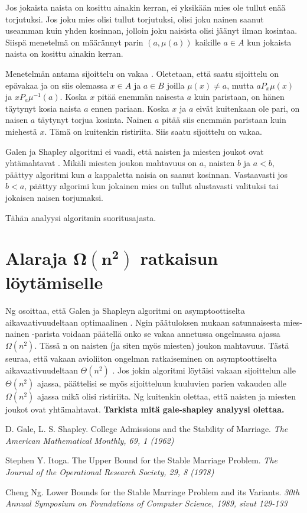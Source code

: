 \documentclass[gradu, twoside]{tktltiki}
\begin{document}
Jos jokaista naista on kosittu ainakin kerran, ei yksikään mies ole
tullut enää torjutuksi. Jos joku mies olisi tullut torjutuksi, olisi
joku nainen saanut useamman kuin yhden kosinnan, jolloin joku naisista
olisi jäänyt ilman kosintaa. Siispä menetelmä on määrännyt parin $(a,
\mu(a))$ kaikille $a \in A$ kun jokaista naista on kosittu ainakin
kerran.

Menetelmän antama sijoittelu on vakaa \cite{galeshapley62}. Oletetaan,
että saatu sijoittelu on epävakaa ja on siis olemassa $x \in A$ ja $a
\in B$ joilla $\mu(x) \neq a$, mutta $aP_x\mu(x)$ ja
$xP_a\mu^{-1}(a)$. Koska $x$ pitää enemmän naisesta $a$ kuin
paristaan, on hänen täytynyt kosia naista $a$ ennen pariaan. Koska $x$
ja $a$ eivät kuitenkaan ole pari, on naisen $a$ täytynyt torjua
kosinta. Nainen $a$ pitää siis enemmän paristaan kuin miehestä $x$.
Tämä on kuitenkin ristiriita. Siis saatu sijoittelu on vakaa.

Galen ja Shapley algoritmi ei vaadi, että naisten ja miesten joukot
ovat yhtämahtavat \cite{galeshapley62}. Mikäli miesten joukon
mahtavuus on $a$, naisten $b$ ja $a < b$, päättyy algoritmi kun $a$
kappaletta naisia on saanut kosinnan. Vastaavasti jos $b < a$, päättyy
algorimi kun jokainen mies on tullut alustavasti valituksi tai
jokaisen naisen torjumaksi.

Tähän analyysi algoritmin suoritusajasta.

\section{Alaraja $\boldsymbol{\Omega(n^2)}$ ratkaisun löytämiselle}

Ng osoittaa, että Galen ja Shapleyn algoritmi on asymptoottiselta
aikavaativuudeltaan optimaalinen \cite{cheng89}. Ngin päätuloksen
mukaan satunnaisesta mies-nainen -parista voidaan päätellä onko se
vakaa annetussa ongelmassa ajassa $\Omega(n^2)$. Tässä n on naisten
(ja siten myös miesten) joukon mahtavuus. Tästä seuraa, että vakaan
avioliiton ongelman ratkaiseminen on asymptoottiselta
aikavaativuudeltaan $\Theta(n^2)$ \cite{cheng89}. Jos jokin algoritmi
löytäisi vakaan sijoittelun alle $\Theta(n^2)$ ajassa, päättelisi se
myös sijoitteluun kuuluvien parien vakauden alle $\Omega(n^2)$ ajassa
mikä olisi ristiriita. Ng kuitenkin olettaa, että naisten ja miesten
joukot ovat yhtämahtavat. \textbf{Tarkista mitä gale-shapley analyysi olettaa.}

\begin{thebibliography}{XXX99}

  D. Gale, L. S. Shapley.
  College Admissions and the Stability of Marriage.
  \emph{The American Mathematical Monthly, 69, 1 (1962)}

  Stephen Y. Itoga.
  The Upper Bound for the Stable Marriage Problem.
  \emph{The Journal of the Operational Research Society, 29, 8 (1978)}

  Cheng Ng.
  Lower Bounds for the Stable Marriage Problem and its Variants.
  \emph{30th Annual Symposium on Foundations of Computer Science,
    1989, sivut 129-133}

\end{thebibliography}
\end{document}
